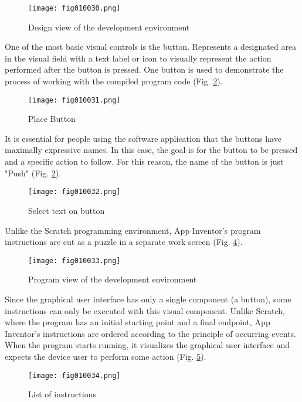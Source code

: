 \begin{figure}[H]
   \centering
   \texttt{[image: fig010030.png]}
   \caption{Design view of the development environment}
\label{fig010030}
\end{figure}

One of the most basic visual controls is the button. Represents a designated area in the visual field with a text label or icon to visually represent the action performed after the button is pressed. One button is used to demonstrate the process of working with the compiled program code (Fig. \ref{fig010031}).

\begin{figure}[H]
   \centering
   \texttt{[image: fig010031.png]}
   \caption{Place Button}
\label{fig010031}
\end{figure}

It is essential for people using the software application that the buttons have maximally expressive names. In this case, the goal is for the button to be pressed and a specific action to follow. For this reason, the name of the button is just "Push" (Fig. \ref{fig010031}).

\begin{figure}[H]
   \centering
   \texttt{[image: fig010032.png]}
   \caption{Select text on button}
\label{fig010032}
\end{figure}

Unlike the Scratch programming environment, App Inventor's program instructions are cut as a puzzle in a separate work screen (Fig. \ref{fig010033}).

\begin{figure}[H]
   \centering
   \texttt{[image: fig010033.png]}
   \caption{Program view of the development environment}
\label{fig010033}
\end{figure}

Since the graphical user interface has only a single component (a button), some instructions can only be executed with this visual component. Unlike Scratch, where the program has an initial starting point and a final endpoint, App Inventor's instructions are ordered according to the principle of occurring events. When the program starts running, it visualizes the graphical user interface and expects the device user to perform some action (Fig. \ref{fig010034}).

\begin{figure}[H]
   \centering
   \texttt{[image: fig010034.png]}
   \caption{List of instructions}
\label{fig010034}
\end{figure}


